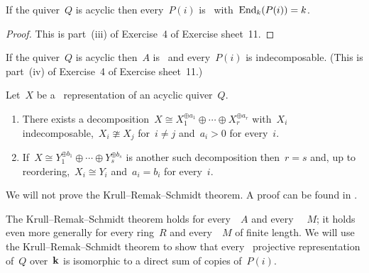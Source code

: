 \begin{corollary*}
  If the quiver~$Q$ is acyclic then every~$P(i)$ is~{\fd} with~$\operatorname{End}_k(P(i)) = k$.
\end{corollary*}


\begin{proof}
  This is part~(iii) of Exercise~4 of Exercise sheet~11.
\end{proof}


\begin{remark}
  If the quiver~$Q$ is acyclic then~$A$ is~{\fd} and every~$P(i)$ is indecomposable.
  (This is part~(iv) of Exercise~4 of Exercise sheet~11.)
\end{remark}


\begin{theoremnonum}
  Let~$X$ be a~{\fd} representation of an acyclic quiver~$Q$.
  \begin{enumerate}
    \item
      There exists a decomposition~$X \cong X_1^{\oplus a_1} \oplus \dotsb \oplus X_r^{\oplus a_r}$ with~$X_i$ indecomposable,~$X_i \ncong X_j$ for~$i \neq j$ and~$a_i > 0$ for every~$i$.
    \item
      If~$X \cong Y_1^{\oplus b_1} \oplus \dotsb \oplus Y_s^{\oplus b_s}$ is another such decomposition then~$r = s$ and, up to reordering,~$X_i \cong Y_i$ and~$a_i = b_i$ for every~$i$.
  \end{enumerate}
\end{theoremnonum}


\begin{remarknonum}
  We will not prove the Krull--Remak--Schmidt theorem.
  A proof can be found in \cite{Elements}.
\end{remarknonum}


\begin{remark*}
  The Krull--Remak--Schmidt theorem holds for every~{\kalg}~$A$ and every {\fd}~{}~$M$;
  it holds even more generally for every ring~$R$ and every~{}~$M$ of finite length.
  We will use the Krull--Remak--Schmidt theorem to show that every~{\fd} projective representation of~$Q$ over~$\mathbf{k}$ is isomorphic to a direct sum of copies of~$P(i)$.
\end{remark*}


